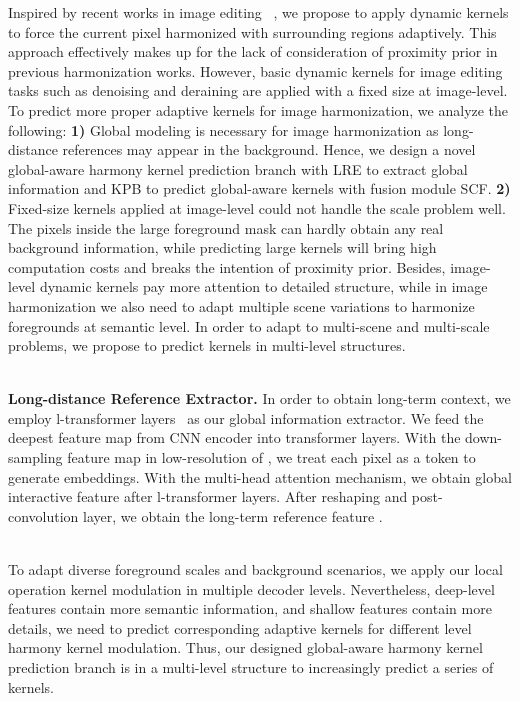 \documentclass[10pt,twocolumn,letterpaper]{article}
\begin{document}
Inspired by recent works in image editing ~\cite{bako2017kernel,guo2021efficientderain,mildenhall2018burst}, we propose to apply dynamic kernels to force the current pixel harmonized with surrounding regions adaptively. This approach effectively makes up for the lack of consideration of proximity prior in previous harmonization works.
However, basic dynamic kernels for image editing tasks such as denoising and deraining are applied with a fixed size at image-level. To predict more proper adaptive kernels for image harmonization, we analyze the following: \textbf{1)} Global modeling is necessary for image harmonization as long-distance references may appear in the background. Hence, we design a novel global-aware harmony kernel prediction branch with LRE to extract global information and KPB to predict global-aware kernels with fusion module SCF. \textbf{2)} Fixed-size kernels applied at image-level could not handle the scale problem well. \eg The pixels inside the large foreground mask can hardly obtain any real background information, while predicting large kernels will bring high computation costs and breaks the intention of proximity prior. Besides, image-level dynamic kernels pay more attention to detailed structure, while in image harmonization we also need to adapt multiple scene variations to harmonize foregrounds at semantic level. In order to adapt to multi-scene and multi-scale problems, we propose to predict kernels in multi-level structures.

~\\
\noindent \textbf{Long-distance Reference Extractor.}
In order to obtain long-term context, we employ l-transformer layers~\cite{dosovitskiy2020image} as our global information extractor. We feed the deepest feature map  from CNN encoder into transformer layers. With the down-sampling feature map in low-resolution of , we treat each pixel as a token to generate embeddings. With the multi-head attention mechanism, we obtain global interactive feature  after l-transformer layers. After reshaping and post-convolution layer, we obtain the long-term reference feature .

~\\
To adapt diverse foreground scales and background scenarios, we apply our local operation kernel modulation in multiple decoder levels. Nevertheless, deep-level features contain more semantic information, and shallow features contain more details, we need to predict corresponding adaptive kernels for different level harmony kernel modulation. Thus, our designed global-aware harmony kernel prediction branch is in a multi-level structure to increasingly predict a series of kernels.
\end{document}
